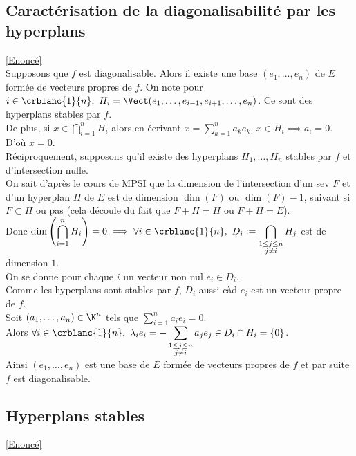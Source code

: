 \documentclass[8pt]{book}
\begin{document}
	\subsection{Caractérisation de la diagonalisabilité par les hyperplans}
	\label{Caractérisation de la diagonalisabilité par les hyperplans corrigé}
	\textcolor{blue}{\hyperref[Caractérisation de la diagonalisabilité par les hyperplans]{[Enoncé]}}\\
	Supposons que $f$ est diagonalisable. Alors il existe une base $(e_1,\dots,e_n)$ de $E$ formée de vecteurs propres de $f$. On note pour $i\in \crblanc{1}{n},\ H_i=\Vect(e_1,\dots,e_{i-1},e_{i+1},\dots,e_n)$. Ce sont des hyperplans stables par $f$.\\
	De plus, si $x\in \displaystyle\bigcap_{i=1}^nH_i$ alors en écrivant $x=\displaystyle\sum_{k=1}^na_ke_k$, $x\in H_i\implies a_i=0$. D'où $x=0$.\\
	Réciproquement, supposons qu'il existe des hyperplans $H_1,\dots,H_n$ stables par $f$ et d'intersection nulle.\\
	On sait d'après le cours de MPSI que la dimension de l'intersection d'un sev $F$ et d'un hyperplan $H$ de $E$ est de dimension $\dim(F)$ ou $\dim(F)-1$, suivant si $F\subset H$ ou pas (cela découle du fait que $F+H=H$ ou $F+H=E$).\\
	Donc $\displaystyle\dim\left(\bigcap_{i=1}^nH_i\right)=0\implies \forall i\in \crblanc{1}{n},\ D_i:=\bigcap_{\substack{1\leq j\leq n\\j\ne i}}H_j$ est de dimension $1$.\\
	On se donne pour chaque $i$ un vecteur non nul $e_i\in D_i$.\\
	Comme les hyperplans sont stables par $f$, $D_i$ aussi càd $e_i$ est un vecteur propre de $f$.\\
	Soit $(a_1,\dots,a_n)\in \K^n$ tels que $\displaystyle\sum_{i=1}^na_ie_i=0$.\\
	Alors $\forall i\in \crblanc{1}{n},\ \lambda_ie_i=-\displaystyle\sum_{\substack{1\leq j\leq n\\j\ne i}}a_je_j\in D_i\cap H_i=\{0\}$.\\
	Ainsi $(e_1,\dots,e_n)$ est une base de $E$ formée de vecteurs propres de $f$ et par suite $f$ est diagonalisable.
	
	\subsection{Hyperplans stables}
	\label{Hyperplans stables corrigé}
	\textcolor{blue}{\hyperref[Hyperplans stables]{[Enoncé]}}\\
	
\end{document}

